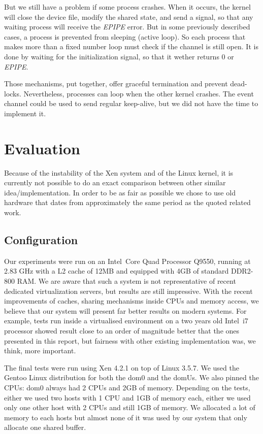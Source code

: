 \documentclass[journal]{IEEEtran}
\begin{document}
But we still have a problem if some process crashes. When it occurs, the kernel will close the device file, modify the shared state, and send a signal, so that any waiting process will receive the \emph{EPIPE} error. But in some previously described cases, a process is prevented from sleeping (active loop). So each process that makes more than a fixed number loop must check if the channel is still open. It is done by waiting for the initialization signal, so that it wether returns 0 or \emph{EPIPE}. 

Those mechanisms, put together, offer graceful termination and prevent dead-locks. Nevertheless, processes can loop when the other kernel crashes. The event channel could be used to send regular keep-alive, but we did not have the time to implement it.  


\section{Evaluation}

Because of the instability of the Xen system and of the Linux kernel, it is currently not possible to do an exact comparison between other similar idea/implementation. In order to be as fair as possible we chose to use old hardware that dates from approximately the same period as the quoted related work.

\subsection{Configuration}

Our experiments were run on an Intel\textregistered ~Core Quad Processor Q9550, running at 2.83 GHz with a L2 cache of 12MB and equipped with 4GB of standard DDR2-800 RAM. We are aware that such a system is not representative of recent dedicated virtualization servers, but results are still impressive.
With the recent improvements of caches, sharing mechanisms inside CPUs and memory access, we believe that our system will present far better results on modern systems. For example, tests run inside a virtualised environment on a two years old Intel\textregistered ~i7 processor showed result close to an order of magnitude better that the ones presented in this report, but fairness with other existing implementation was, we think, more important.

The final tests were run using Xen 4.2.1 on top of Linux 3.5.7. We used the Gentoo Linux distribution for both the dom0 and the domUs. We also pinned the CPUs: dom0 always had 2 CPUs and 2GB of memory. Depending on the tests, either we used two hosts with 1 CPU and 1GB of memory each, either we used only one other host with 2 CPUs and still 1GB of memory. We allocated a lot of memory to each hosts but almost none of it was used by our system that only allocate one shared buffer.
\end{document}
